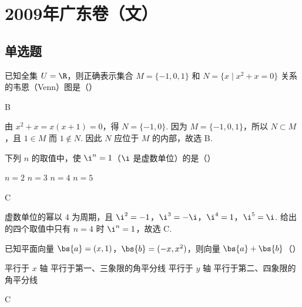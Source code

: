 \chapter{2009年广东卷（文）}

\section{单选题}

\begin{problem}
已知全集 \(U = \R\)，则正确表示集合 \(M = \{-1, 0, 1\}\) 和 \(N = \{x \mid x^2 + x = 0\}\) 关系的韦恩（Venn）图是（\quad）

\end{problem}

\begin{answer}
B
\end{answer}

\begin{solution}
由 \(x^2+x=x(x+1)=0\)，得 \(N=\{-1,0\}\). 因为 \(M=\{-1,0,1\}\)，所以 \(N\subset M\)，且 \(1\in M\) 而 \(1\notin N\). 因此 \(N\) 应位于 \(M\) 的内部，故选 B.
\end{solution}

\begin{problem}
下列 \(n\) 的取值中，使 \(\i^n = 1\)（\(\i\) 是虚数单位）的是（\quad）

\choices
    {\(n = 2\)}
    {\(n = 3\)}
    {\(n = 4\)}
    {\(n = 5\)}
\end{problem}

\begin{answer}
C
\end{answer}

\begin{solution}
虚数单位的幂以 \(4\) 为周期，且 \(\i^2=-1\)，\(\i^3=-\i\)，\(\i^4=1\)，\(\i^5=\i\). 给出的四个取值中只有 \(n=4\) 时 \(\i^n=1\)，故选 C.
\end{solution}

\begin{problem}
已知平面向量 \( \bs{a} = (x, 1) \)，\( \bs{b} = (-x, x^{2}) \)，则向量 \( \bs{a} + \bs{b} \)（\quad）

\choices
    {平行于 \(x\) 轴}
    {平行于第一、三象限的角平分线}
    {平行于 \(y\) 轴}
    {平行于第二、四象限的角平分线}
\end{problem}

\begin{answer}
C
\end{answer}

